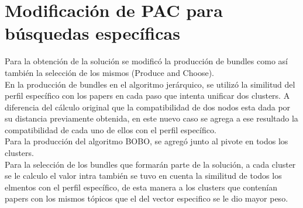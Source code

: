 \section{Modificación de PAC para búsquedas específicas}
Para la obtención de la solución se modificó la producción de bundles como así también la 
selección de los mismos (Produce and Choose). \\
En la producción de bundles en el algoritmo jerárquico, se utilizó la similitud del perfil 
específico con los papers en cada paso que intenta unificar dos clusters. A diferencia del cálculo 
original que la compatibilidad de dos nodos esta dada por su distancia previamente obtenida, en 
este nuevo caso se agrega a ese resultado la compatibilidad de cada uno de ellos con el perfil 
específico. \\
Para la producción del algoritmo BOBO, se agregó junto al pivote en todos los clusters. \\
Para la selección de los bundles que formarán parte de la solución, a cada cluster se le 
calculo el valor intra también se tuvo en cuenta la similitud de todos los elmentos con el perfil  
específico, de esta manera a los clusters que contenían papers con los mismos tópicos que el del 
vector especifico se le dio mayor peso.
